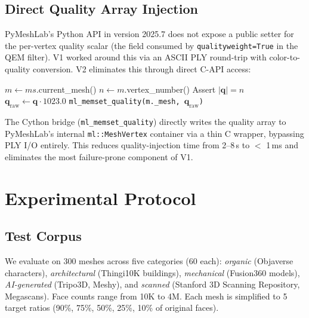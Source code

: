\documentclass[10pt, twocolumn, a4paper]{article}
\newcommand{\vect}[1]{\bm{#1}}
\begin{document}
\subsection{Direct Quality Array Injection}
\label{sec:direct}

PyMeshLab's Python API in version 2025.7 does not expose a public
setter for the per-vertex quality scalar (the field consumed by
\texttt{qualityweight=True} in the QEM filter). V1 worked around
this via an ASCII PLY round-trip with color-to-quality conversion.
V2 eliminates this through direct C-API access:

\begin{algorithm}[ht]
\caption{Direct Quality Injection via Cython bridge}
\label{alg:direct_inject}
\begin{algorithmic}[1]
\Procedure{InjectQuality}{$ms$: MeshSet, $\vect{q} \in [0,1]^n$}
  \State $m \gets ms$.current\_mesh()
  \State $n \gets m$.vertex\_number()
  \State Assert $|\vect{q}| = n$
  \State $\vect{q}_{\text{raw}} \gets \vect{q} \cdot 1023.0$
  \State \texttt{ml\_memset\_quality(m.\_mesh, $\vect{q}_{\text{raw}}$)}
\EndProcedure
\end{algorithmic}
\end{algorithm}

The Cython bridge (\texttt{ml\_memset\_quality}) directly writes the
quality array to PyMeshLab's internal \texttt{ml::MeshVertex}
container via a thin C wrapper, bypassing PLY I/O entirely. This
reduces quality-injection time from 2--8\,s to $<$ 1\,ms and
eliminates the most failure-prone component of V1.

\section{Experimental Protocol}
\label{sec:experiments}

\subsection{Test Corpus}
We evaluate on 300 meshes across five categories (60 each):
\emph{organic} (Objaverse characters), \emph{architectural}
(Thingi10K buildings), \emph{mechanical} (Fusion360 models),
\emph{AI-generated} (Tripo3D, Meshy), and \emph{scanned}
(Stanford 3D Scanning Repository, Megascans). Face counts range
from 10K to 4M. Each mesh is simplified to 5 target ratios
(90\%, 75\%, 50\%, 25\%, 10\% of original faces).
\end{document}
